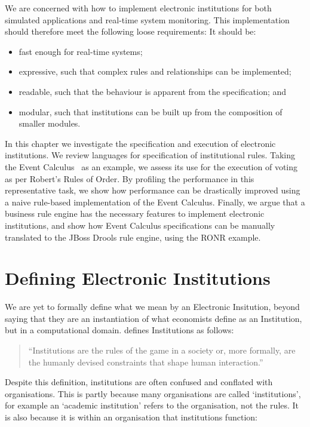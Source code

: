 We are concerned with how to implement electronic institutions for both
simulated applications and real-time system monitoring. This implementation
should therefore meet the following loose requirements:
It should be:
\begin{itemize}
\item fast enough for real-time systems;
\item expressive, such that complex rules and relationships can be implemented;
\item readable, such that the behaviour is apparent from the specification; and
\item modular, such that institutions can be built up from the composition of smaller modules.
\end{itemize}

In this chapter we investigate the specification and execution of electronic
institutions. We review languages for specification of institutional rules.
Taking the Event Calculus~\citep{Kowalski1986} as an example, we assess its use for the execution of
voting as per Robert's Rules of Order. By profiling the performance in this representative task, we show how performance can be drastically
improved using a naive rule-based implementation of the Event Calculus. Finally,
we argue that a business rule engine has the necessary features to implement
electronic institutions, and show how Event Calculus specifications can be manually
translated to the JBoss Drools rule engine, using the \ac{RONR} example. 


\section{Defining Electronic Institutions}\label{sec:instdefn}

We are yet to formally define what we mean by an Electronic
Insitution, beyond saying that they are an instantiation of what economists
define as an Institution, but in a computational domain. \citet{North1990}
defines Institutions as follows: 

\begin{quote}
``Institutions are the rules of the
game in a society or, more formally, are the humanly devised constraints that
shape human interaction.''~\citep[p.3]{North1990}
\end{quote}

Despite this definition, institutions are often confused and conflated with
organisations. This is partly because many organisations are called
`institutions', for example an `academic institution' refers to the
organisation, not the rules. It is also because it is within an organisation
that institutions function:

